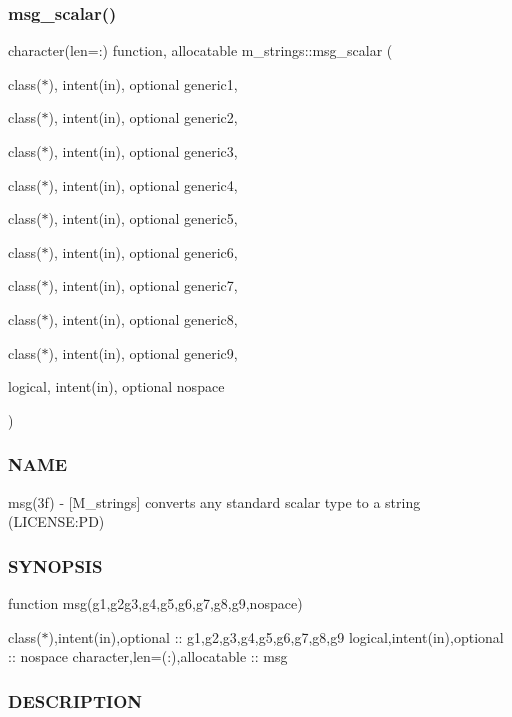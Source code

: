 \subsubsection{\texorpdfstring{msg\+\_\+scalar()}{msg\_scalar()}}
{\footnotesize\ttfamily character(len=\+:) function, allocatable m\+\_\+strings\+::msg\+\_\+scalar (\begin{DoxyParamCaption}\item[{class($\ast$), intent(in), optional}]{generic1,  }\item[{class($\ast$), intent(in), optional}]{generic2,  }\item[{class($\ast$), intent(in), optional}]{generic3,  }\item[{class($\ast$), intent(in), optional}]{generic4,  }\item[{class($\ast$), intent(in), optional}]{generic5,  }\item[{class($\ast$), intent(in), optional}]{generic6,  }\item[{class($\ast$), intent(in), optional}]{generic7,  }\item[{class($\ast$), intent(in), optional}]{generic8,  }\item[{class($\ast$), intent(in), optional}]{generic9,  }\item[{logical, intent(in), optional}]{nospace }\end{DoxyParamCaption})\hspace{0.3cm}{\ttfamily [private]}}



\subsubsection*{N\+A\+ME}

msg(3f) -\/ \mbox{[}M\+\_\+strings\mbox{]} converts any standard scalar type to a string (L\+I\+C\+E\+N\+SE\+:PD) \subsubsection*{S\+Y\+N\+O\+P\+S\+IS}

function msg(g1,g2g3,g4,g5,g6,g7,g8,g9,nospace)

class($\ast$),intent(in),optional \+:\+: g1,g2,g3,g4,g5,g6,g7,g8,g9 logical,intent(in),optional \+:\+: nospace character,len=(\+:),allocatable \+:\+: msg

\subsubsection*{D\+E\+S\+C\+R\+I\+P\+T\+I\+ON}

